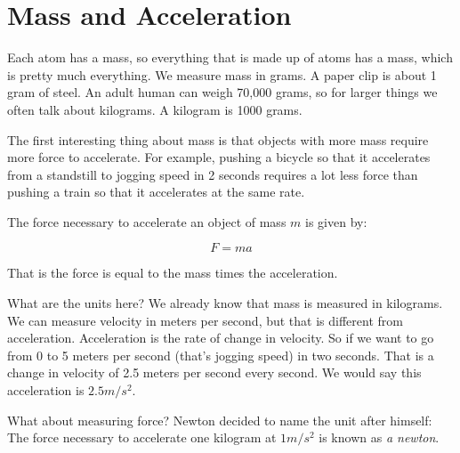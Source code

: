 \section{Mass and Acceleration}

Each atom has a mass, so everything that is made up of atoms has a
mass, which is pretty much everything.  We measure mass in grams.  A
paper clip is about 1 gram of steel. An adult human can weigh 70,000
grams, so for larger things we often talk about kilograms. A kilogram
is 1000 grams.

The first interesting thing about mass is that objects with more mass
require more force to accelerate. For example, pushing a bicycle so
that it accelerates from a standstill to jogging speed in 2 seconds
requires a lot less force than pushing a train so that it accelerates
at the same rate.


\begin{mdframed}[style=important, frametitle={Newton's Second Law of Motion}]

The force necessary to accelerate an object of mass $m$ is given by:

$$F = m a$$

That is the force is equal to the mass times the acceleration.

\end{mdframed}

What are the units here? We already know that mass is measured in
kilograms. We can measure velocity in meters per second, but that is
different from acceleration. Acceleration is the rate of change in
velocity. So if we want to go from 0 to 5 meters per second (that's
jogging speed) in two seconds. That is a change in velocity of 2.5
meters per second every second. We would say this acceleration is $2.5
m/s^2$.

What about measuring force? Newton decided to name the unit after
himself: The force necessary to accelerate one kilogram at $1 m/s^2$
is known as \textit{a newton}.

